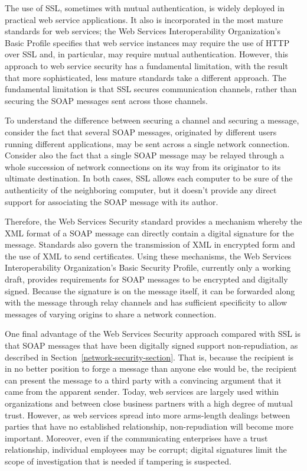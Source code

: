 The use of SSL, sometimes with mutual authentication, is widely
deployed in practical web service applications.  It also is
incorporated in the most mature standards for web services; the Web
Services Interoperability Organization's Basic Profile specifies that
web service instances may require the use of HTTP over SSL and, in
particular, may require mutual authentication.  However, this approach to
web service security has a fundamental limitation, with the result
that more sophisticated, less mature standards take a different approach.
The fundamental limitation is that SSL secures communication channels,
rather than securing the SOAP messages sent across those channels.

To understand the difference between securing a channel and securing a
message, consider the fact that several SOAP messages, originated by
different users running different applications, may be sent across a
single network connection.  Consider also the fact that a single SOAP
message may be relayed through a whole succession of network
connections on its way from its originator to its ultimate
destination.  In both cases, SSL allows each computer to be sure of
the authenticity of the neighboring computer, but it doesn't provide
any direct support for associating the SOAP message with its author.

Therefore, the Web Services Security standard provides a mechanism
whereby the XML format of a SOAP message can directly contain a
digital signature for the message.  Standards also govern the
transmission of XML in encrypted form and the use of XML to send
certificates.  Using these mechanisms, the Web Services
Interoperability Organization's Basic Security Profile, currently only
a working draft, provides requirements for SOAP messages to be
encrypted and digitally signed.  Because the signature is on the
message itself, it can be forwarded along with the message through
relay channels and has sufficient specificity to allow messages of
varying origins to share a network connection.

One final advantage of the Web Services Security approach compared
with SSL is that SOAP messages that have been digitally signed support
non-repudiation, as described in
Section~\ref{network-security-section}.  That is, because the
recipient is in no better position to forge a message than anyone else
would be, the recipient can present the message to a third party with
a convincing argument that it came from the apparent sender.  Today,
web services are largely used within organizations and between close
business partners with a high degree of mutual trust.  However, as web
services spread into more arms-length dealings between parties that
have no established relationship, non-repudiation will become more
important.  Moreover, even if the communicating enterprises have a
trust relationship, individual employees may be corrupt; digital
signatures limit the scope of investigation that is needed if
tampering is suspected.


